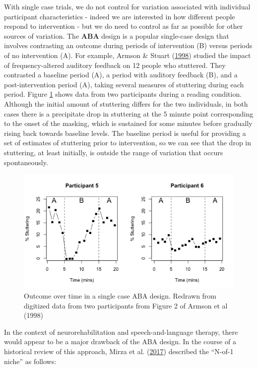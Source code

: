 \documentclass{krantz}
\begin{document}
With single case trials, we do not control for variation associated with individual participant characteristics - indeed we are interested in how different people respond to intervention - but we do need to control as far as possible for other sources of variation. The \textbf{ABA} design is a popular single-case design that involves contrasting an outcome during periods of intervention (B) versus periods of no intervention (A). For example, Armson \& Stuart (\protect\hyperlink{ref-armson1998}{1998}) studied the impact of frequency-altered auditory feedback on 12 people who stuttered. They contrasted a baseline period (A), a period with auditory feedback (B), and a post-intervention period (A), taking several measures of stuttering during each period. Figure \ref{fig:SingleCaseDplot} shows data from two participants during a reading condition. Although the initial amount of stuttering differs for the two individuals, in both cases there is a precipitate drop in stuttering at the 5 minute point corresponding to the onset of the masking, which is sustained for some minutes before gradually rising back towards baseline levels. The baseline period is useful for providing a set of estimates of stuttering prior to intervention, so we can see that the drop in stuttering, at least initially, is outside the range of variation that occurs spontaneously.

\begin{figure}
\includegraphics[width=0.85\linewidth]{images_bw/SingleCaseDplot} \caption{Outcome over time in a single case ABA design. Redrawn from digitized data from two participants from Figure 2 of Armson et al (1998)}\label{fig:SingleCaseDplot}
\end{figure}

In the context of neurorehabilitation and speech-and-language therapy, there would appear to be a major drawback of the ABA design. In the course of a historical review of this approach, Mirza et al. (\protect\hyperlink{ref-mirza2017}{2017}) described the ``N-of-1 niche'' as follows:
\end{document}
